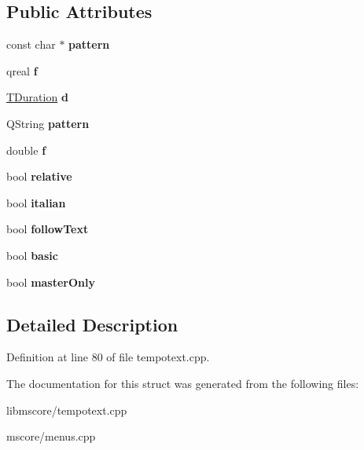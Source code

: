 \subsection*{Public Attributes}
\begin{DoxyCompactItemize}
\item 
\mbox{\label{struct_ms_1_1_tempo_pattern_af530acb7090aa8e554509300e9cf9290}} 
const char $\ast$ {\bfseries pattern}
\item 
\mbox{\label{struct_ms_1_1_tempo_pattern_ac1e34328f61887fb4282473853072134}} 
qreal {\bfseries f}
\item 
\mbox{\label{struct_ms_1_1_tempo_pattern_a6f639f676aa2ab6629461bd6d07e45d1}} 
\hyperlink{class_ms_1_1_t_duration}{T\+Duration} {\bfseries d}
\item 
\mbox{\label{struct_ms_1_1_tempo_pattern_aa129f75bbc01d2b5da32db13dd18bae1}} 
Q\+String {\bfseries pattern}
\item 
\mbox{\label{struct_ms_1_1_tempo_pattern_ae6153fa0e90758f6dae203c129159344}} 
double {\bfseries f}
\item 
\mbox{\label{struct_ms_1_1_tempo_pattern_ad531ac10d31e18dc3b306d4b0c140b89}} 
bool {\bfseries relative}
\item 
\mbox{\label{struct_ms_1_1_tempo_pattern_a65eb5a176a850ca3ce0294aad3061a51}} 
bool {\bfseries italian}
\item 
\mbox{\label{struct_ms_1_1_tempo_pattern_ac29ff093a088f92283e87b16f101485f}} 
bool {\bfseries follow\+Text}
\item 
\mbox{\label{struct_ms_1_1_tempo_pattern_af35ce6e4e972c09c2d94710287f7621a}} 
bool {\bfseries basic}
\item 
\mbox{\label{struct_ms_1_1_tempo_pattern_a8103627c099cd3252343b1a25f967aa2}} 
bool {\bfseries master\+Only}
\end{DoxyCompactItemize}


\subsection{Detailed Description}


Definition at line 80 of file tempotext.\+cpp.



The documentation for this struct was generated from the following files\+:\begin{DoxyCompactItemize}
\item 
libmscore/tempotext.\+cpp\item 
mscore/menus.\+cpp\end{DoxyCompactItemize}
